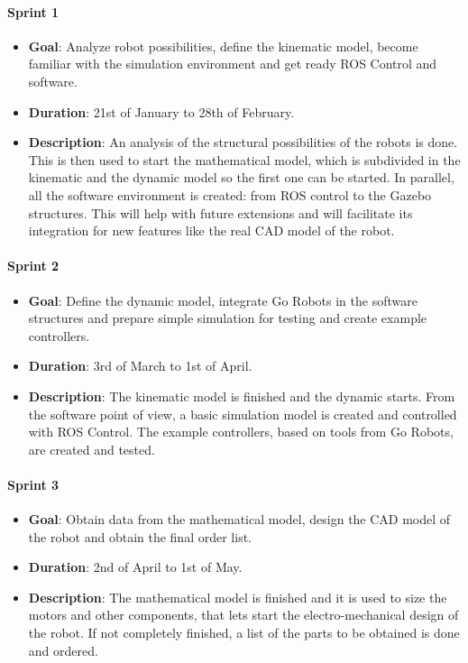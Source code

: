 \paragraph{\textbf{Sprint 1}}
\begin{itemize}
  \item \textbf{Goal}: Analyze robot possibilities, define the kinematic model, become familiar with the simulation environment and get ready ROS Control and software.
  \item \textbf{Duration}: 21st of January to 28th of February.
  \item \textbf{Description}: An analysis of the structural possibilities of the robots is done. This is then used to start the mathematical model, which is subdivided in the kinematic and the dynamic model so the first one can be started. In parallel, all the software environment is created: from ROS control to the Gazebo structures. This will help with future extensions and will facilitate its integration for new features like the real CAD model of the robot.
\end{itemize}
\paragraph{\textbf{Sprint 2}}
  \begin{itemize}
    \item \textbf{Goal}: Define the dynamic model, integrate Go Robots in the software structures and prepare simple simulation for testing and create example controllers.
    \item \textbf{Duration}: 3rd of March to 1st of April.
    \item \textbf{Description}: The kinematic model is finished and the dynamic starts. From the software point of view, a basic simulation model is created and controlled with ROS Control. The example controllers, based on tools from Go Robots, are created and tested.
  \end{itemize}
\paragraph{\textbf{Sprint 3}}
  \begin{itemize}
    \item \textbf{Goal}: Obtain data from the mathematical model, design the CAD model of the robot and obtain the final order list.
    \item \textbf{Duration}: 2nd of April to 1st of May.
    \item \textbf{Description}: The mathematical model is finished and it is used to size the motors and other components, that lets start the electro-mechanical design of the robot. If not completely finished, a list of the parts to be obtained is done and ordered.
  \end{itemize}
